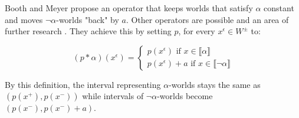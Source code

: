\documentclass[english, 12pt]{scrartcl}
\theoremstyle{definition}
\theoremstyle{definition}
\theoremstyle{definition}
\newcommand{\modelsOf}[1]{\llbracket #1 \rrbracket}
\begin{document}
Booth and Meyer propose an operator that keeps worlds that satisfy $\alpha$ constant and moves $\neg\alpha$-worlds "back" by $a$. Other operators are possible and an area of further research \cite{Booth2011}. They achieve this by setting $p$, for every $x^{\epsilon} \in W^{\pm}$ to:
    
\begin{equation*}
    (p \ast \alpha)(x^{\epsilon}) = \left\{
                    \begin{array}{ll}
                      p(x^{\epsilon}) \textrm{ if } x \in \modelsOf{\alpha}\\
                      p(x^{\epsilon}) + a \textrm{ if } x \in \modelsOf{\neg\alpha}
                    \end{array}
                  \right.
\end{equation*}

By this definition, the interval representing $\alpha$-worlds stays the same as $(p(x^{+}), p(x^{-}))$ while intervals of $\neg\alpha$-worlds become $(p(x^{-}), p(x^{-}) + a)$.
\end{document}
